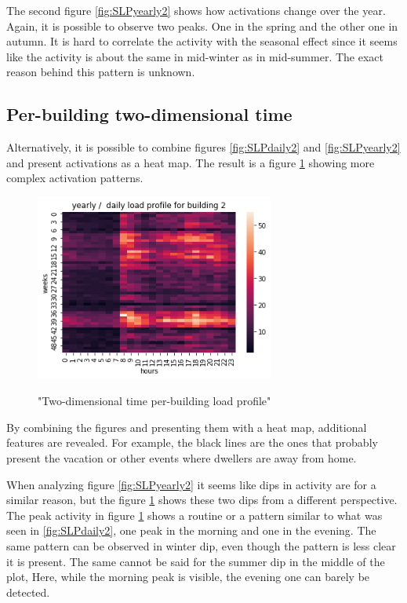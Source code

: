 The second figure \ref{fig:SLPyearly2} shows how activations change over the year.  
Again, it is possible to observe two peaks.
One in the spring and the other one in autumn. 
It is hard to correlate the activity with the seasonal effect since it seems like the activity is about the same in mid-winter as in mid-summer. 
The exact reason behind this pattern is unknown.

\subsection{Per-building two-dimensional time}

Alternatively, it is possible to combine figures \ref{fig:SLPdaily2} and \ref{fig:SLPyearly2} and present activations as a heat map.
The result is a figure \ref{fig:SLPHMyearly2} showing more complex activation patterns.

\begin{figure}[H]
	\centering
	\caption{"Two-dimensional time per-building load profile"}
	\includegraphics[width=0.7\textwidth]{../Figures/LPS/SLPHMyearly2.png}
	\label{fig:SLPHMyearly2}
\end{figure}

By combining the figures and presenting them with a heat map, additional features are revealed.
For example, the black lines are the ones that probably present the vacation or other events where dwellers are away from home.

When analyzing figure \ref{fig:SLPyearly2} it seems like dips in activity are for a similar reason, but the figure  \ref{fig:SLPHMyearly2} shows these two dips from a different perspective.
The peak activity in figure \ref{fig:SLPHMyearly2} shows a routine or a pattern similar to what was seen in  \ref{fig:SLPdaily2}, one peak in the morning and one in the evening. 
The same pattern can be observed in winter dip, even though the pattern is less clear it is present.
The same cannot be said for the summer dip in the middle of the plot, Here, while the morning peak is visible, the evening one can barely be detected.


